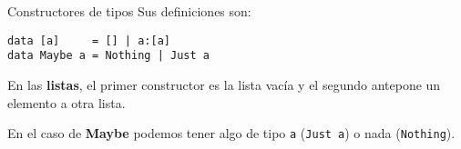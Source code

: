 \begin{frame}[fragile]{Constructores de tipos}
  Sus definiciones son:

  \espacio

  \begin{lstlisting}
data [a]     = [] | a:[a]
data Maybe a = Nothing | Just a
  \end{lstlisting}

  \espacio

  En las \textbf{listas}, el primer constructor es la lista vacía y
  el segundo antepone un elemento a otra lista.

  \espacio

  En el caso de \textbf{Maybe} podemos tener algo de tipo \texttt{a} (\texttt{Just a})
  o nada (\texttt{Nothing}).
\end{frame}
